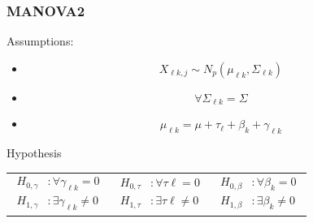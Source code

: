 \documentclass[aspectratio=169,10pt,t]{beamer}
\begin{document}
\begin{frame}[t]
	\frametitle{MANOVA2}

	Assumptions:
	\begin{itemize}
		\item 
			\[
				X_{\ell k,j} \sim N_{p}  \left( \mu_{\ell k}, \Sigma_{\ell k}  \right) 
			\] 
		\item 
			\[
				\forall \Sigma_{\ell k} = \Sigma
			\] 
		\item 
			\[
				\mu_{\ell k} = \mu + \tau_{\ell} + \beta_{k} + \gamma_{\ell k}
			\] 
	\end{itemize}

	Hypothesis\\
	\begin{centering}

		\begin{tabular}{ccc}
			$
			\begin{aligned}
				H_{0,\gamma} &: \forall \gamma_{\ell k} = 0\\
				H_{1,\gamma} &: \exists \gamma_{\ell k} \neq 0
			\end{aligned}
			$ & $
			\begin{aligned}
				H_{0,\tau} &: \forall \tau{\ell} = 0\\
				H_{1,\tau} &: \exists \tau{\ell} \neq 0
			\end{aligned}
			$	& $
			\begin{aligned}
				H_{0,\beta} &: \forall \beta_{k} = 0\\
				H_{1,\beta} &: \exists \beta_{k} \neq 0
			\end{aligned}
			$
		\end{tabular}
	\end{centering}
\end{frame}
\end{document}
